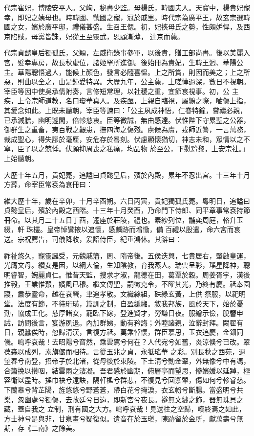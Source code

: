 \begin{pinyinscope}
 代宗崔妃，博陵安平人。父峋，秘書少監。母楊氏，韓國夫人。天寶中，楊貴妃寵幸，即妃之姨母也。時韓國、虢國之寵，冠於戚里。時代宗為廣平王，故玄宗選韓國之女，嬪於廣平邸，禮儀甚盛。生召王偲。初，妃挾母氏之勢，性頗妒悍，及西京陷賊，母黨皆誅，妃從王至靈武，恩顧漸薄，
 達京而薨。



 代宗貞懿皇后獨孤氏，父穎，左威衛錄事參軍，以後貴，贈工部尚書。後以美麗入宮，嬖幸專房，故長秋虛位，諸姬罕所進御。後始冊為貴妃，生韓王迥、華陽公主。華陽聰悟過人，能候上顏色，發言必隨喜慍。上之所賞，則因而美之；上之所惡，則曲以全之，由是鐘愛特異。大歷九年，公主薨，上嗟悼過深，數日不視朝。宰臣等因中使吳承倩附奏，言修短常理，以社稷之重，宜節哀視事。初，公
 主疾，上令宗師道教，名曰瓊華真人。及疾亟，上親自臨視，屬纊之際，嚙傷上指，其愛念如此。上既未聽朝，宰臣等諫曰：「公主夙成神悟，仁眷特鐘，嘗禱必親，已承減膳，幽明遽間，倍軫慈衷。臣等微誠，無由感達。伏惟陛下守累聖之公器，御群生之重畜，夷百戰之艱患，撫四海之傷殘。虜候為虞，戎師近警，一言萬務，裁成聖心，得失謬於毫厘，安危存於晷刻。伏慮顧懷猶切，神志未和，眾情以之不寧，臣子以之兢悸。伏願抑周喪之私痛，均品物
 於至公，下慰黔黎，上安宗社。」上始聽朝。



 大歷十年五月，貴妃薨，追謚曰貞懿皇后，殯於內殿，累年不忍出宮。十三年十月方葬，命宰臣常袞為哀冊曰：



 維大歷十年，歲在辛卯，十月辛酉朔。六日丙寅，貴妃獨孤氏薨。粵明日，追謚曰貞懿皇后，殯於內殿之西階。十三年十月癸酉，乃命門下侍郎、同平章事常袞持節冊命。以其月二十五日丁酉，遷座於莊陵，禮也。素紗列位，黼奕周庭，輅升玉綴，軒珠欞。皇帝悼鸞掖以追懷，感麟跡而增慟，備
 百禮以殷遣，命六宮而哀送。宗祝薦告，司儀降收，爰詔侍臣，紀垂鴻休。其辭曰：



 祚祉悠久，寵靈誕受，元魏戚籓，周、隋帝後。五侯迭興，七貴居右，肇啟皇運，光膺文母。纘女是因，以綱大倫，生知陰教，育我蒸人。瑞雲呈彩，瑤星降神，聰明睿智，婉麗貞仁。惟昔天監，搜求才淑，龍德在田，葛覃於穀。周姜胥宇，漢後推轂，王業惟艱，嬪風已穆。繼文傳聖，嗣徽克令，不曜其光，乃終有慶。祗奉園寢，肅恭靈命，越在哀煢，聿追孝敬。文織絲組，硃綠玄黃，上供
 祭服，以祀明堂。法度有節，不待珩璜，篇訓之制，自盈縑緗。敘我邦族，風於天下，始於憂勤，協成王化。慈厚諸女，寵臨下嫁，登進賢才，勞謙日夜。服繒示儉，脫簪申誡，訪問後言，宴游夙退。內加群娣，動有矜誨；外睦諸親，泣辭封拜。闕翟有日，親蠶俟時，忽歸清漢，言復方祗。萬乘悼懷，群臣慕思，玉衣追慶，金鈿同儀。嗚呼哀哉！去昭陽兮窅然，乘雲駕兮何在？人代宛兮如舊，炎涼倏兮已改。翠葆森以成列，素旗儼而相待。言從玉兆之貞，永牴瑤華
 之彩。別長秋之西苑，過望春兮南登，招帝子於北渚，從母後於東陵。下土清兮動金翠，外無像兮中有馮，合簫挽以攢咽，結雲雨之淒凝。吾君感於幽期，俯層亭而望思，慘嬪媛以延踔，極容衛以盡時。搖巾袂兮遠訣，隔軒檻兮群悲，不復見兮回禦輦，傷如何兮軫睿慈。下蘭皋兮背芷陽，旌悠悠兮野蒼蒼，帶白花兮掩淚，衣玄帉兮斷腸。當盛明兮共樂，忽幽處兮獨傷，去故廷兮日遠，即新宮兮夜長。襚無文繡之飾，器無珠貝之藏，蓋自我之
 立制，刑有國之大方。嗚呼哀哉！見送往之空歸，嘆終焉之如此，方士神兮是與非，甘泉畫兮疑復似。遺音在於玉瑱，陳跡留於金所，獻萬壽兮無期，存《二南》之餘美。




\end{pinyinscope}
